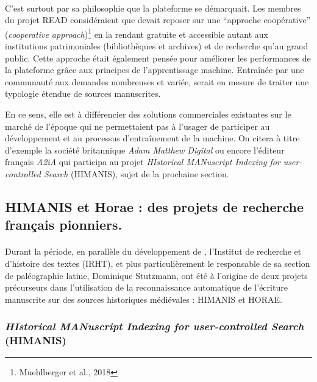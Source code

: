 \documentclass[a4paper,12pt,twoside]{book}
\begin{document}
\paragraph{}
C'est surtout par sa philosophie que la plateforme se démarquait. Les membres du projet READ considéraient que  devait reposer sur une \enquote{approche coopérative} (\textit{cooperative approach})\footnote{Muehlberger et al., 2018} en la rendant gratuite et accessible autant aux institutions patrimoniales (bibliothèques et archives) et de recherche qu'au grand public. Cette approche était également pensée pour améliorer les performances de la plateforme grâce aux principes de l’apprentissage machine. Entraînée par une communauté aux demandes nombreuses et variée,  serait en mesure de traiter une typologie étendue de sources manuscrites.

En ce sens, elle est à différencier des solutions commerciales existantes sur le marché de l'époque qui ne permettaient pas à l’usager de participer au développement et au processus d’entraînement de la machine. On citera à titre d’exemple la société britannique  \textit{Adam Matthew Digital} ou encore l'éditeur français \textit{A2iA} qui participa au projet \textit{HIstorical MANuscript Indexing for user-controlled Search} (HIMANIS), sujet de la prochaine section. 

\subsection{HIMANIS et Horae : des projets de recherche français pionniers.}

\paragraph{}
Durant la période, en parallèle du développement de , l’Institut de recherche et d’histoire des textes (IRHT), et plus particulièrement le responsable de sa section de paléographie latine, Dominique Stutzmann, ont été à l’origine de deux projets précurseurs dans l’utilisation de la reconnaissance automatique de l’écriture manuscrite sur des sources historiques médiévales : HIMANIS et HORAE.

\subsubsection{\textit{HIstorical MANuscript Indexing for user-controlled Search} (HIMANIS)}
\end{document}
